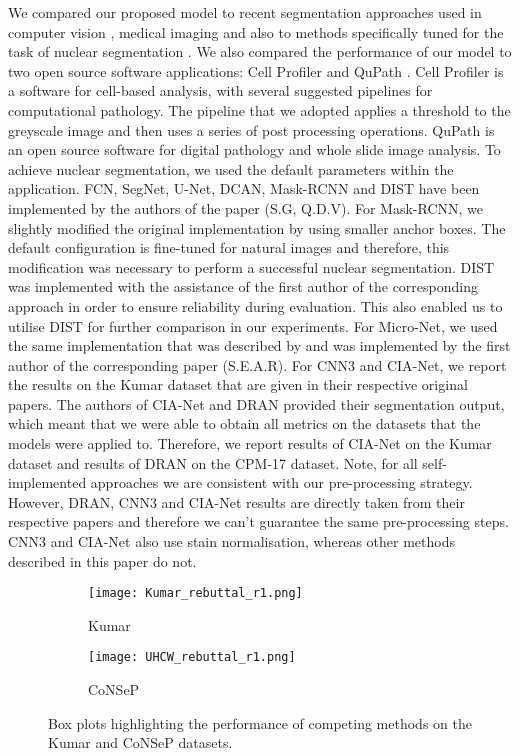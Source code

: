 \documentclass[journal]{IEEEtran}
\begin{document}
	 
	We compared our proposed model to recent segmentation approaches used in computer vision \cite{long2015fully, badrinarayanan2017segnet, mrcnn}, medical imaging \cite{ronneberger2015u} and also to methods specifically tuned for the task of nuclear segmentation \cite{chen2016dcan, micronet2018Shan,naylor2018segmentation,zhou2019cia,vu2018methods}. We also compared the performance of our model to two open source software applications: Cell Profiler \cite{carpenter2006cellprofiler} and QuPath \cite{bankhead2017qupath}. Cell Profiler is a software for cell-based analysis, with several suggested pipelines for computational pathology. The pipeline that we adopted applies a threshold to the greyscale image and then uses a series of post processing operations. QuPath is an open source software for digital pathology and whole slide image analysis. To achieve nuclear segmentation, we used the default parameters within the application. FCN, SegNet, U-Net, DCAN, Mask-RCNN and DIST have been implemented by the authors of the paper (S.G, Q.D.V). For Mask-RCNN, we slightly modified the original implementation by using smaller anchor boxes. The default configuration is fine-tuned for natural images and therefore, this modification was necessary to perform a successful nuclear segmentation. DIST was implemented with the assistance of the first author of the corresponding approach in order to ensure reliability during evaluation. This also enabled us to utilise DIST for further comparison in our experiments. For Micro-Net, we used the same implementation that was described by \cite{micronet2018Shan} and was implemented by the first author of the corresponding paper (S.E.A.R). For CNN3 and CIA-Net, we report the results on the Kumar dataset that are given in their respective original papers. The authors of CIA-Net and DRAN provided their segmentation output, which meant that we were able to obtain all metrics on the datasets that the models were applied to. Therefore, we report results of CIA-Net on the Kumar dataset and results of DRAN on the CPM-17 dataset. Note, for all self-implemented approaches we are consistent with our pre-processing strategy. However, DRAN, CNN3 and CIA-Net results are directly taken from their respective papers and therefore we can't guarantee the same pre-processing steps. CNN3 and CIA-Net also use stain normalisation, whereas other methods described in this paper do not. 
	
	\begin{figure*}[!t]
		\centering
        \begin{subfigure}[t]{1.0\linewidth}
            \centering
            \texttt{[image: Kumar\_rebuttal\_r1.png]} 
            \caption{Kumar}
            \label{fig:boxplot1}
        \end{subfigure}
        \begin{subfigure}[t]{1.0\linewidth}
            \centering
            \texttt{[image: UHCW\_rebuttal\_r1.png]} 
            \caption{CoNSeP}
            \label{fig:boxplot2}
        \end{subfigure}
		\caption{Box plots highlighting the performance of competing methods on the Kumar and CoNSeP datasets.}
	\end{figure*}
	
\end{document}
